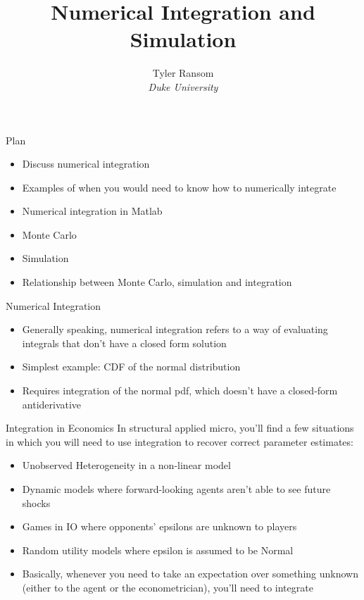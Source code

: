 \documentclass[english,xcolor=dvipsnames]{beamer}
\begin{document}
\begin{frame}
\title{Numerical Integration and Simulation}
\author{
	Tyler Ransom\\
	\emph{Duke University}\\
}
\titlepage
\end{frame}

\begin{frame}{Plan}
\begin{itemize}
	\item Discuss numerical integration
	\item Examples of when you would need to know how to numerically integrate
	\item Numerical integration in Matlab
	\item Monte Carlo
	\item Simulation
	\item Relationship between Monte Carlo, simulation and integration
\end{itemize}
\end{frame}

\begin{frame}{Numerical Integration}
\begin{itemize}
	\item Generally speaking, numerical integration refers to a way of evaluating integrals that don't have a closed form solution
	\item Simplest example: CDF of the normal distribution
  \item Requires integration of the normal pdf, which doesn't have a closed-form antiderivative
\end{itemize}
\end{frame}

\begin{frame}{Integration in Economics}
In structural applied micro, you'll find a few situations in which you will need to use integration to recover correct parameter estimates:
\begin{itemize}
	\item Unobserved Heterogeneity in a non-linear model
	\item Dynamic models where forward-looking agents aren't able to see future shocks 
	\item Games in IO where opponents' epsilons are unknown to players
	\item Random utility models where epsilon is assumed to be Normal
	\item Basically, whenever you need to take an expectation over something unknown (either to the agent or the econometrician), you'll need to integrate
\end{itemize}
\end{frame}
\end{document}
